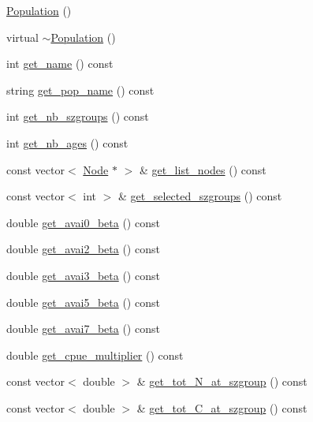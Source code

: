 \begin{DoxyCompactItemize}
\item 
\mbox{\hyperlink{class_population_a54eb24ca89470eebe0c27bcb03a0ceae}{Population}} ()
\item 
virtual \mbox{\hyperlink{class_population_a4c8cedd0f038e41746fb6084639f5616}{$\sim$\+Population}} ()
\item 
int \mbox{\hyperlink{class_population_a60dfa66b65b6146ea6f2f49a40667d0c}{get\+\_\+name}} () const
\item 
string \mbox{\hyperlink{class_population_ab297cd923f7361ac308d25467536db77}{get\+\_\+pop\+\_\+name}} () const
\item 
int \mbox{\hyperlink{class_population_aea1eba0e5aaab417352b9821b36f650d}{get\+\_\+nb\+\_\+szgroups}} () const
\item 
int \mbox{\hyperlink{class_population_a1a8f8cdab0d8527983d4cf2c72292ca0}{get\+\_\+nb\+\_\+ages}} () const
\item 
const vector$<$ \mbox{\hyperlink{class_node}{Node}} $\ast$ $>$ \& \mbox{\hyperlink{class_population_aa0a1faaf348f64c4f279c4eb8ebc6438}{get\+\_\+list\+\_\+nodes}} () const
\item 
const vector$<$ int $>$ \& \mbox{\hyperlink{class_population_a15281fffe73cc53524f119a20d8a4762}{get\+\_\+selected\+\_\+szgroups}} () const
\item 
double \mbox{\hyperlink{class_population_a32115ccdce71ca9cf4a7e610d2812af8}{get\+\_\+avai0\+\_\+beta}} () const
\item 
double \mbox{\hyperlink{class_population_aa5250248f8643d26b3c5c26c1e53413d}{get\+\_\+avai2\+\_\+beta}} () const
\item 
double \mbox{\hyperlink{class_population_a5e14b47bc170ad8ed99abfa4b59897c1}{get\+\_\+avai3\+\_\+beta}} () const
\item 
double \mbox{\hyperlink{class_population_ab4ce37e8b52472dfe746a71bb306aabb}{get\+\_\+avai5\+\_\+beta}} () const
\item 
double \mbox{\hyperlink{class_population_ab4444e97f3bfd8cea8cda408894d789a}{get\+\_\+avai7\+\_\+beta}} () const
\item 
double \mbox{\hyperlink{class_population_a08709c449a6cb68b7e6cd5cfcd35e6e8}{get\+\_\+cpue\+\_\+multiplier}} () const
\item 
const vector$<$ double $>$ \& \mbox{\hyperlink{class_population_a9f2f01dc06493d6b534db38a3251b70e}{get\+\_\+tot\+\_\+\+N\+\_\+at\+\_\+szgroup}} () const
\item 
const vector$<$ double $>$ \& \mbox{\hyperlink{class_population_a581b6357727756ecf9bc103034dacdfa}{get\+\_\+tot\+\_\+\+C\+\_\+at\+\_\+szgroup}} () const

\end{DoxyCompactItemize}
